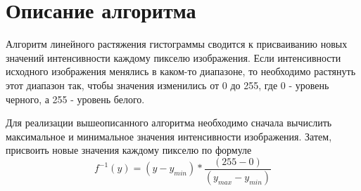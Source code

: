 \documentclass{report}
\begin{document}
\section*{Описание алгоритма}
\par Алгоритм линейного растяжения гистограммы сводится к присваиванию новых значений интенсивности каждому пикселю изображения. Если интенсивности исходного изображения менялись в каком-то диапазоне, то необходимо растянуть этот диапазон так, чтобы значения изменились от 0 до 255, где 0 - уровень черного, а 255 - уровень белого.
\par Для реализации вышеописанного алгоритма необходимо сначала вычислить максимальное и минимальное значения интенсивности изображения. Затем, присвоить новые значения каждому пикселю по формуле $$f^{-1}(y) = (y - y_{min}) * \frac{(255 - 0)}{(y_{max} - y_{min})}$$
\newpage

\end{document}
